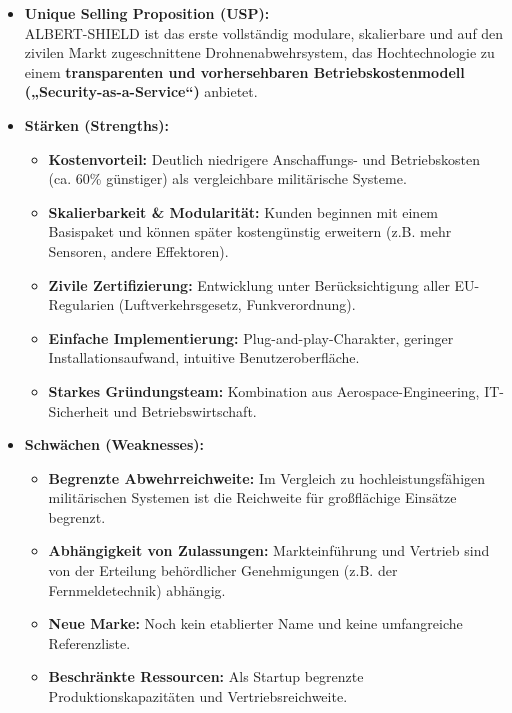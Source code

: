 \documentclass[11pt,a4paper]{article}
\begin{document}
\begin{itemize}
    \item \textbf{Unique Selling Proposition (USP):} \\
    ALBERT-SHIELD ist das erste vollständig modulare, skalierbare und auf den zivilen Markt zugeschnittene Drohnenabwehrsystem, das Hochtechnologie zu einem \textbf{transparenten und vorhersehbaren Betriebskostenmodell („Security-as-a-Service“)} anbietet.
    
    \item \textbf{Stärken (Strengths):}
    \begin{itemize}
        \item \textbf{Kostenvorteil:} Deutlich niedrigere Anschaffungs- und Betriebskosten (ca. 60\% günstiger) als vergleichbare militärische Systeme.
        \item \textbf{Skalierbarkeit \& Modularität:} Kunden beginnen mit einem Basispaket und können später kostengünstig erweitern (z.B. mehr Sensoren, andere Effektoren).
        \item \textbf{Zivile Zertifizierung:} Entwicklung unter Berücksichtigung aller EU-Regularien (Luftverkehrsgesetz, Funkverordnung).
        \item \textbf{Einfache Implementierung:} Plug-and-play-Charakter, geringer Installationsaufwand, intuitive Benutzeroberfläche.
        \item \textbf{Starkes Gründungsteam:} Kombination aus Aerospace-Engineering, IT-Sicherheit und Betriebswirtschaft.
    \end{itemize}
    
    \item \textbf{Schwächen (Weaknesses):}
    \begin{itemize}
        \item \textbf{Begrenzte Abwehrreichweite:} Im Vergleich zu hochleistungsfähigen militärischen Systemen ist die Reichweite für großflächige Einsätze begrenzt.
        \item \textbf{Abhängigkeit von Zulassungen:} Markteinführung und Vertrieb sind von der Erteilung behördlicher Genehmigungen (z.B. der Fernmeldetechnik) abhängig.
        \item \textbf{Neue Marke:} Noch kein etablierter Name und keine umfangreiche Referenzliste.
        \item \textbf{Beschränkte Ressourcen:} Als Startup begrenzte Produktionskapazitäten und Vertriebsreichweite.
    \end{itemize}
\end{itemize}
\end{document}

